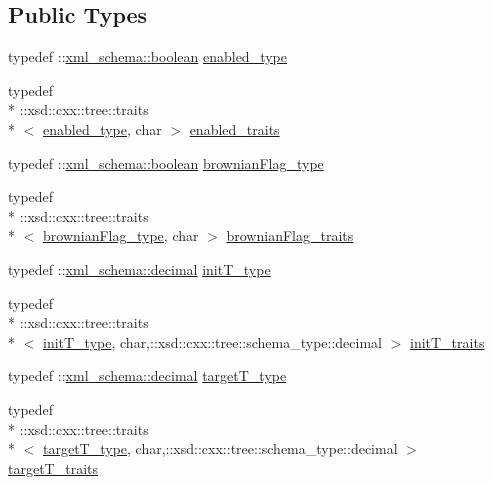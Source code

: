 \subsection*{Public Types}
\begin{DoxyCompactItemize}
\item 
typedef \-::\hyperlink{namespacexml__schema_ae5ada4ec9c54b51765c3e4c0e9631bba}{xml\-\_\-schema\-::boolean} \hyperlink{classthermo__t_adf9ac04cf37c2de46153e42511aa24c2}{enabled\-\_\-type}
\item 
typedef \\*
\-::xsd\-::cxx\-::tree\-::traits\\*
$<$ \hyperlink{classthermo__t_adf9ac04cf37c2de46153e42511aa24c2}{enabled\-\_\-type}, char $>$ \hyperlink{classthermo__t_a3519860d0f767ed502e2be7b8fe6ed82}{enabled\-\_\-traits}
\item 
typedef \-::\hyperlink{namespacexml__schema_ae5ada4ec9c54b51765c3e4c0e9631bba}{xml\-\_\-schema\-::boolean} \hyperlink{classthermo__t_a124b0a16394a6c7839596d1a8ba5c35b}{brownian\-Flag\-\_\-type}
\item 
typedef \\*
\-::xsd\-::cxx\-::tree\-::traits\\*
$<$ \hyperlink{classthermo__t_a124b0a16394a6c7839596d1a8ba5c35b}{brownian\-Flag\-\_\-type}, char $>$ \hyperlink{classthermo__t_a8d99eb3bef87e3c08389e73aae1bf5d1}{brownian\-Flag\-\_\-traits}
\item 
typedef \-::\hyperlink{namespacexml__schema_a69bfaf24f63a8c18ebd8e21db6b343df}{xml\-\_\-schema\-::decimal} \hyperlink{classthermo__t_a29526c32fe31feb33a21833b0040dca7}{init\-T\-\_\-type}
\item 
typedef \\*
\-::xsd\-::cxx\-::tree\-::traits\\*
$<$ \hyperlink{classthermo__t_a29526c32fe31feb33a21833b0040dca7}{init\-T\-\_\-type}, char,\-::xsd\-::cxx\-::tree\-::schema\-\_\-type\-::decimal $>$ \hyperlink{classthermo__t_a078bc14d3b7eb9c04aa1457e24ab7c20}{init\-T\-\_\-traits}
\item 
typedef \-::\hyperlink{namespacexml__schema_a69bfaf24f63a8c18ebd8e21db6b343df}{xml\-\_\-schema\-::decimal} \hyperlink{classthermo__t_a87b71140ee6bb1936aeed1d3b79a3596}{target\-T\-\_\-type}
\item 
typedef \\*
\-::xsd\-::cxx\-::tree\-::traits\\*
$<$ \hyperlink{classthermo__t_a87b71140ee6bb1936aeed1d3b79a3596}{target\-T\-\_\-type}, char,\-::xsd\-::cxx\-::tree\-::schema\-\_\-type\-::decimal $>$ \hyperlink{classthermo__t_acf5862bbbc6795105277c01ea3797d48}{target\-T\-\_\-traits}

\end{DoxyCompactItemize}

